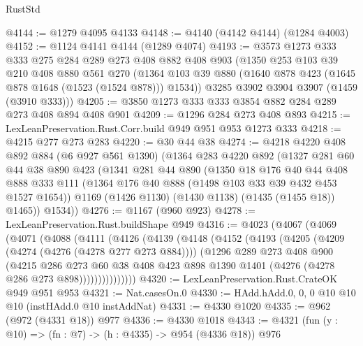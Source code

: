 \begin{lexlean}{RustStd}
\begin{coremodule}
@4144 := @1279 @4095 @4133
@4148 := @4140 (@4142 @4144) (@1284 @4003)
@4152 := @1124 @4141 @4144 (@1289 @4074)
@4193 := @3573
    @1273
    @333
    @333
    @275
    @284
    @289
    @273
    @408
    @882
    @408
    @903
    (@1350
      @253
      @103
      @39
      @210
      @408
      @880
      @561
      @270
      (@1364 @103 @39 @880 (@1640 @878 @423 (@1645 @878 @1648 (@1523 (@1524 @878))) @1534))
      @3285
      @3902
      @3904
      @3907
      (@1459 (@3910 @333)))
@4205 := @3850 @1273 @333 @333 @3854 @882 @284 @289 @273 @408 @894 @408 @901
@4209 := @1296 @284 @273 @408 @893
@4215 := LexLeanPreservation.Rust.Corr.build @949 @951 @953 @1273 @333
@4218 := @4215 @277 @273 @283
@4220 := @30 @44 @38
@4274 := @4218
    @4220
    @408
    @892
    @884
    (@6 @927 @561 @1390)
    (@1364
      @283
      @4220
      @892
      (@1327
        @281
        @60
        @44
        @38
        @890
        @423
        (@1341
          @281
          @44
          @890
          (@1350
            @18
            @176
            @40
            @44
            @408
            @888
            @333
            @111
            (@1364 @176 @40 @888 (@1498 @103 @33 @39 @432 @453 @1527 @1654))
            @1169
            (@1426 @1130)
            (@1430 @1138)
            (@1435 (@1455 @18))
            @1465))
        @1534))
@4276 := @1167 (@960 @923)
@4278 := LexLeanPreservation.Rust.buildShape @949
@4316 := @4023
    (@4067
      (@4069
        (@4071
          (@4088
            (@4111
              (@4126
                (@4139
                  (@4148
                    (@4152
                      (@4193
                        (@4205
                          (@4209 (@4274 (@4276 (@4278 @277 @273 @884))))
                          (@1296
                            @289
                            @273
                            @408
                            @900
                            (@4215
                              @286
                              @273
                              @60
                              @38
                              @408
                              @423
                              @898
                              @1390
                              @1401
                              (@4276 (@4278 @286 @273 @898)))))))))))))))
@4320 := LexLeanPreservation.Rust.CrateOK @949 @951 @953
@4321 := Nat.casesOn.{0}
@4330 := HAdd.hAdd.{0, 0, 0} @10 @10 @10 (instHAdd.{0} @10 instAddNat)
@4331 := @4330 @1020
@4335 := @962 (@972 (@4331 @18)) @977
@4336 := @4330 @1018
@4343 := @4321 (fun (y : @10) => (fn : @7) -> (h : @4335) -> @954 (@4336 @18)) @976

\end{coremodule}
\end{lexlean}
